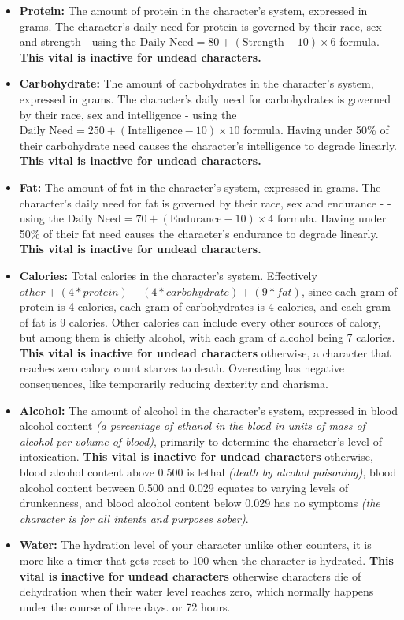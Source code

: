 \begin{itemize}
\item \textbf{Protein:} The amount of protein in the character's system, expressed in grams. The character's daily need for protein is governed by their race, sex and strength - using the $\text{Daily Need} = 80 + (\text{Strength} - 10) \times 6$ formula. \textbf{This vital is inactive for undead characters.}
\item \textbf{Carbohydrate:} The amount of carbohydrates in the character's system, expressed in grams. The character's daily need for carbohydrates is governed by their race, sex and intelligence - using the $\text{Daily Need} = 250 + (\text{Intelligence} - 10) \times 10$ formula. Having under 50\% of their carbohydrate need causes the character's intelligence to degrade linearly. \textbf{This vital is inactive for undead characters.}
\item \textbf{Fat:} The amount of fat in the character's system, expressed in grams. The character's daily need for fat is governed by their race, sex and endurance - - using the $\text{Daily Need} = 70 + (\text{Endurance} - 10) \times 4$ formula. Having under 50\% of their fat need causes the character's endurance to degrade linearly. \textbf{This vital is inactive for undead characters.}
\item \textbf{Calories:} Total calories in the character's system. Effectively $other+(4*protein)+(4*carbohydrate)+(9*fat)$, since each gram of protein is 4 calories, each gram of carbohydrates is 4 calories, and each gram of fat is 9 calories. Other calories can include every other sources of calory, but among them is chiefly alcohol, with each gram of alcohol being 7 calories. \textbf{This vital is inactive for undead characters} \textemdash otherwise, a character that reaches zero calory count starves to death. Overeating has negative consequences, like temporarily reducing dexterity and charisma.
\item \textbf{Alcohol:} The amount of alcohol in the character's system, expressed in blood alcohol content \textit{(a percentage of ethanol in the blood in units of mass of alcohol per volume of blood)}, primarily to determine the character's level of intoxication. \textbf{This vital is inactive for undead characters} \textemdash otherwise, blood alcohol content above 0.500 is lethal \textit{(death by alcohol poisoning)}, blood alcohol content between 0.500 and 0.029 equates to varying levels of drunkenness, and blood alcohol content below 0.029 has no symptoms \textit{(the character is for all intents and purposes sober)}.
\item \textbf{Water:} The hydration level of your character \textemdash unlike other counters, it is more like a timer that gets reset to 100 when the character is hydrated. \textbf{This vital is inactive for undead characters} \textemdash otherwise characters die of dehydration when their water level reaches zero, which normally happens under the course of three days. or 72 hours.

\end{itemize}
